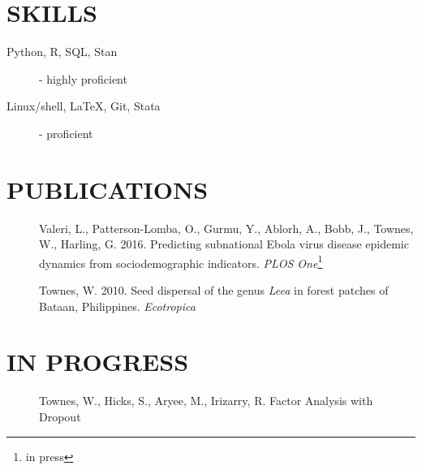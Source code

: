 \documentclass[line, margin]{res}
\begin{document}
\begin{resume}
\section{SKILLS}
\begin{description}
\item[Python, R, SQL, Stan] - highly proficient
\item[Linux/shell, \LaTeX, Git, Stata] - proficient
\end{description}

\section{PUBLICATIONS}

\begin{description}
\item[] Valeri, L., Patterson-Lomba, O., Gurmu, Y., Ablorh, A., Bobb, J., Townes, W., Harling, G. 2016. Predicting subnational Ebola virus disease epidemic dynamics from sociodemographic indicators. \textit{PLOS One}\footnote{in press}
\end{description}

\begin{description}
\item[] Townes, W. 2010. Seed dispersal of the genus \textit{Leea} in forest patches of Bataan, Philippines. \textit{Ecotropica}
\end{description}


\section{IN PROGRESS}
\begin{description}
\item[] Townes, W., Hicks, S., Aryee, M., Irizarry, R. Factor Analysis with Dropout
\end{description}


\end{resume}
\end{document}

